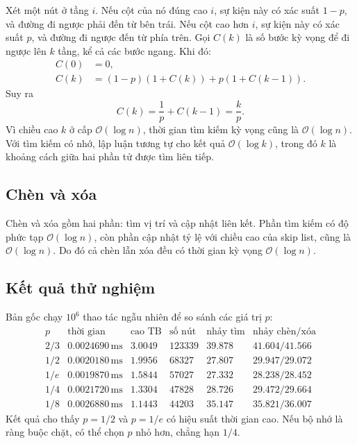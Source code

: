 \documentclass[11pt]{article}
\newcommand{\Oh}{\mathcal{O}}
\begin{document}
Xét một nút ở tầng \(i\). Nếu cột của nó đúng cao \(i\), sự kiện này có xác
suất \(1-p\), và đường đi ngược phải đến từ bên trái. Nếu cột cao hơn \(i\),
sự kiện này có xác suất \(p\), và đường đi ngược đến từ phía trên. Gọi
\(C(k)\) là số bước kỳ vọng để đi ngược lên \(k\) tầng, kể cả các bước ngang.
Khi đó:
\[
\begin{aligned}
  C(0)&=0,\\
  C(k)&=(1-p)(1+C(k))+p(1+C(k-1)).
\end{aligned}
\]
Suy ra
\[
  C(k)=\frac{1}{p}+C(k-1)=\frac{k}{p}.
\]
Vì chiều cao \(k\) ở cấp \(\Oh(\log n)\), thời gian tìm kiếm kỳ vọng cũng là
\(\Oh(\log n)\). Với tìm kiếm có nhớ, lập luận tương tự cho kết quả
\(\Oh(\log k)\), trong đó \(k\) là khoảng cách giữa hai phần tử được tìm liên
tiếp.

\subsection{Chèn và xóa}

Chèn và xóa gồm hai phần: tìm vị trí và cập nhật liên kết. Phần tìm kiếm có
độ phức tạp \(\Oh(\log n)\), còn phần cập nhật tỷ lệ với chiều cao của skip
list, cũng là \(\Oh(\log n)\). Do đó cả chèn lẫn xóa đều có thời gian kỳ vọng
\(\Oh(\log n)\).

\subsection{Kết quả thử nghiệm}

Bản gốc chạy \(10^6\) thao tác ngẫu nhiên để so sánh các giá trị \(p\):
\[
\begin{array}{lrrrrr}
p & \text{thời gian} & \text{cao TB} & \text{số nút} &
\text{nhảy tìm} & \text{nhảy chèn/xóa}\\
\hline
2/3 & 0.0024690\,\mathrm{ms} & 3.0049 & 123339 & 39.878 & 41.604/41.566\\
1/2 & 0.0020180\,\mathrm{ms} & 1.9956 & 68327 & 27.807 & 29.947/29.072\\
1/e & 0.0019870\,\mathrm{ms} & 1.5844 & 57027 & 27.332 & 28.238/28.452\\
1/4 & 0.0021720\,\mathrm{ms} & 1.3304 & 47828 & 28.726 & 29.472/29.664\\
1/8 & 0.0026880\,\mathrm{ms} & 1.1443 & 44203 & 35.147 & 35.821/36.007
\end{array}
\]
Kết quả cho thấy \(p=1/2\) và \(p=1/e\) có hiệu suất thời gian cao. Nếu bộ nhớ
là ràng buộc chặt, có thể chọn \(p\) nhỏ hơn, chẳng hạn \(1/4\).
\end{document}
